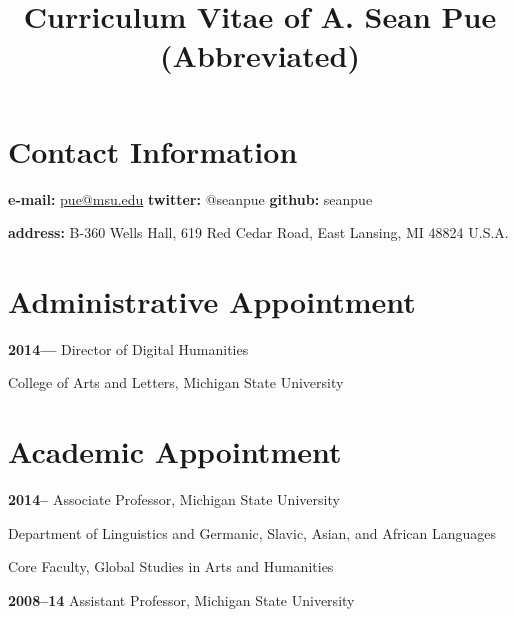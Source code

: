 \documentclass[letterpaper,12pt]{article}
\title{\phantomsection%
  Curriculum Vitae of A. Sean Pue (Abbreviated)%
  \label{curriculum-vitae-of-a-sean-pue-abbreviated}}
\author{}
\date{}
\newenvironment{DUlineblock}[1]{%
    \list{}{\setlength{\partopsep}{\parskip}
            \addtolength{\partopsep}{\baselineskip}
            \setlength{\topsep}{0pt}
            \setlength{\itemsep}{0.15\baselineskip}
            \setlength{\parsep}{0pt}
            \setlength{\leftmargin}{#1}}
    \raggedright
  }
  {\endlist}
\begin{document}
\maketitle


\section{Contact Information%
  \label{contact-information}%
}

\begin{DUlineblock}{0em}
\item[] \textbf{e-mail:}
\href{mailto:pue@msu.edu}{pue@msu.edu}
\textbf{twitter:}
@seanpue
\textbf{github:}
seanpue
\item[] \textbf{address:}
B-360 Wells Hall, 619 Red Cedar Road, East Lansing, MI 48824 U.S.A.
\end{DUlineblock}


\section{Administrative Appointment%
  \label{administrative-appointment}%
}

\begin{DUlineblock}{0em}
\item[] \textbf{2014—}
Director of Digital Humanities
\item[]
\begin{DUlineblock}{\DUlineblockindent}
\item[] College of Arts and Letters, Michigan State University
\end{DUlineblock}
\end{DUlineblock}


\section{Academic Appointment%
  \label{academic-appointment}%
}

\begin{DUlineblock}{0em}
\item[] \textbf{2014–}
Associate Professor, Michigan State University
\item[]
\begin{DUlineblock}{\DUlineblockindent}
\item[] Department of Linguistics and Germanic, Slavic, Asian, and African Languages
\item[] Core Faculty, Global Studies in Arts and Humanities
\end{DUlineblock}
\item[] \textbf{2008–14}
Assistant Professor, Michigan State University
\end{DUlineblock}
\end{document}
